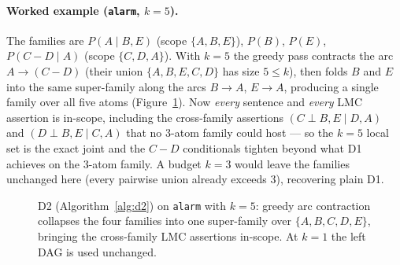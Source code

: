 \documentclass[11pt]{article}
\begin{document}
\paragraph{Worked example (\texttt{alarm}, $k{=}5$).} The families are $P(A\mid B,E)$ (scope
$\{A,B,E\}$), $P(B)$, $P(E)$, $P(C\!-\!D\mid A)$ (scope $\{C,D,A\}$). With $k{=}5$ the greedy
pass contracts the arc $A\!\to\!(C\!-\!D)$ (their union $\{A,B,E,C,D\}$ has size $5\le k$),
then folds $B$ and $E$ into the same super-family along the arcs $B\!\to\!A$, $E\!\to\!A$,
producing a single family over all five atoms (Figure~\ref{fig:d2}). Now \emph{every}
sentence and \emph{every} LMC assertion is in-scope, including the cross-family assertions
$(C\perp B,E\mid D,A)$ and $(D\perp B,E\mid C,A)$ that no $3$-atom family could host --- so the
$k{=}5$ local set is the exact joint and the $C\!-\!D$ conditionals tighten beyond what D1
achieves on the $3$-atom family. A budget $k{=}3$ would leave the families unchanged here
(every pairwise union already exceeds $3$), recovering plain D1.

\begin{figure}[t]
\centering
{}
\caption{D2 (Algorithm~\ref{alg:d2}) on \texttt{alarm} with $k{=}5$: greedy arc contraction
  collapses the four families into one super-family over $\{A,B,C,D,E\}$, bringing the
  cross-family LMC assertions in-scope. At $k{=}1$ the left DAG is used unchanged.}
\label{fig:d2}
\end{figure}
\end{document}
